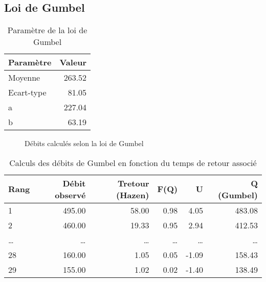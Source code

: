 \subsection{Loi de Gumbel}
\begin{table}[H]
    \centering
    \begin{tabular}{l|r}
        \toprule
        \textbf{Paramètre} & \textbf{Valeur} \\
        \midrule
        Moyenne            & 263.52          \\
        Ecart-type         & 81.05           \\
        a                  & 227.04          \\
        b                  & 63.19           \\
        \bottomrule
    \end{tabular}
    \caption{Paramètre de la loi de Gumbel}
    \label{tab:param_Gumbel}
\end{table}

\begin{figure}[H]
    \centering
    \caption{Débits calculés selon la loi de Gumbel}
    \label{graph:debits_gumbel}
\end{figure}

\begin{table}[H]
    \centering
    \begin{tabular}{l|r|r|r|r|r}
        \toprule
        \textbf{Rang} & \textbf{Débit observé} & \textbf{Tretour (Hazen)} & \textbf{F(Q)} & \textbf{U} & \textbf{Q (Gumbel)} \\
        \midrule
        1             & 495.00                 & 58.00                    & 0.98          & 4.05       & 483.08              \\
        2             & 460.00                 & 19.33                    & 0.95          & 2.94       & 412.53              \\
        \dots         & \dots                  & \dots                    & \dots         & \dots      & \dots               \\
        28            & 160.00                 & 1.05                     & 0.05          & -1.09      & 158.43              \\
        29            & 155.00                 & 1.02                     & 0.02          & -1.40      & 138.49              \\
        \bottomrule
    \end{tabular}
    \caption{Calculs des débits de Gumbel en fonction du temps de retour associé}
    \label{tab:gumbelcalcul}
\end{table}

